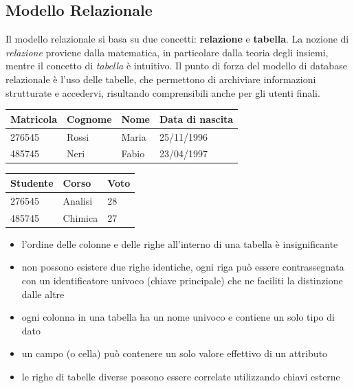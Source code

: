 \subsection{Modello Relazionale}
Il modello relazionale si basa su due concetti: \textbf{relazione} e \textbf{tabella}. La nozione di \textit{relazione} proviene dalla matematica, in particolare dalla teoria degli insiemi, mentre il concetto di \textit{tabella} è intuitivo. Il punto di forza del modello di database relazionale è l'uso delle tabelle, che permettono di archiviare informazioni strutturate e accedervi, risultando comprensibili anche per gli utenti finali.
\begin{table}[H]
    \centering
    \begin{tabular}{ |p{2cm}||p{2cm}|p{2cm}|p{3cm}|  }
        \hline
        Matricola & Cognome & Nome & Data di nascita\\
        \hline
        276545 & Rossi & Maria & 25/11/1996\\
        485745 & Neri & Fabio & 23/04/1997\\
        \hline
    \end{tabular}
\end{table}
\begin{table}[H]
    \centering
    \begin{tabular}{ |p{2cm}||p{2cm}|p{2cm}|  }
        \hline
        Studente & Corso & Voto\\
        \hline
        276545 & Analisi & 28\\
        485745 & Chimica & 27\\
        \hline
    \end{tabular}
\end{table}
\begin{itemize}
    \item l'ordine delle colonne e delle righe all'interno di una tabella è insignificante
    \item non possono esistere due righe identiche, ogni riga può essere contrassegnata con un identificatore univoco (chiave principale) che ne faciliti la distinzione dalle altre
    \item  ogni colonna in una tabella ha un nome univoco e contiene un solo tipo di dato
    \item un campo (o cella) può contenere un solo valore effettivo di un attributo
    \item le righe di tabelle diverse possono essere correlate utilizzando chiavi esterne
\end{itemize}

